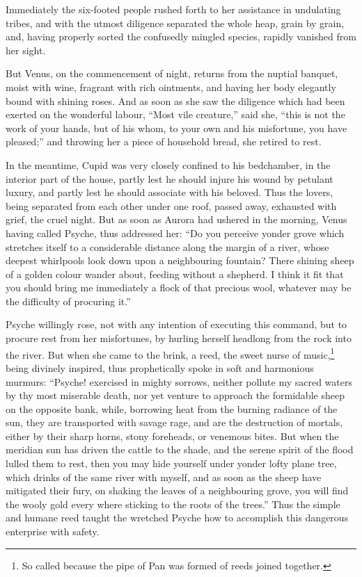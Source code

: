 \documentclass{article}
\begin{document}
Immediately the six-footed people rushed forth to her assistance in undulating
tribes, and with the utmost diligence separated the whole heap, grain by grain,
and, having properly sorted the confusedly mingled species, rapidly vanished
from her sight.

But Venus, on the commencement of night, returns from the nuptial banquet,
moist with wine, fragrant with rich ointments, and having her body elegantly
bound with shining roses. And as soon as she saw the diligence which had been
exerted on the wonderful labour, ``Most vile creature,'' said she, ``this is
not the work of your hands, but of his whom, to your own and his misfortune,
you have pleased;'' and throwing her a piece of household bread, she retired to
rest.

In the meantime, Cupid was very closely confined to his bedchamber, in the
interior part of the house, partly lest he should injure his wound by petulant
luxury, and partly lest he should associate with his beloved. Thus the lovers,
being separated from each other under one roof, passed away, exhausted with
grief, the cruel night. But as soon as Aurora had ushered in the morning, Venus
having called Psyche, thus addressed her: ``Do you perceive yonder grove which
stretches itself to a considerable distance along the margin of a river, whose
deepest whirlpools look down upon a neighbouring fountain? There shining sheep
of a golden colour wander about, feeding without a shepherd. I think it fit
that you should bring me immediately a flock of that precious wool, whatever
may be the difficulty of procuring it.''

Psyche willingly rose, not with any intention of executing this command, but to
procure rest from her misfortunes, by hurling herself headlong from the rock
into the river. But when she came to the brink, a reed, the sweet nurse of
music,\footnote{So called because the pipe of Pan was formed of reeds joined
together.} being divinely inspired, thus prophetically spoke in soft and
harmonious murmurs: ``Psyche! exercised in mighty sorrows, neither pollute my
sacred waters by thy most miserable death, nor yet venture to approach the
formidable sheep on the opposite bank, while, borrowing heat from the burning
radiance of the sun, they are transported with savage rage, and are the
destruction of mortals, either by their sharp horns, stony foreheads, or
venemous bites. But when the meridian sun has driven the cattle to the shade,
and the serene spirit of the flood lulled them to rest, then you may hide
yourself under yonder lofty plane tree, which drinks of the same river with
myself, and as soon as the sheep have mitigated their fury, on shaking the
leaves of a neighbouring grove, you will find the wooly gold every where
sticking to the roots of the trees.'' Thus the simple and humane reed taught
the wretched Psyche how to accomplish this dangerous enterprise with safety.
\end{document}

